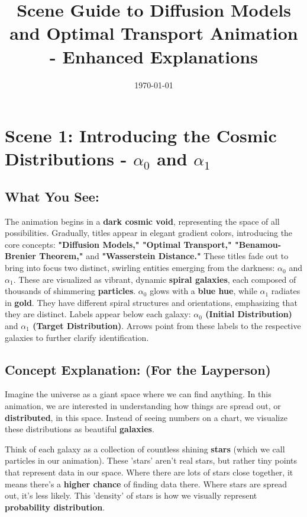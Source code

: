 \documentclass{article}
\title{Scene Guide to Diffusion Models and Optimal Transport Animation - Enhanced Explanations}
\date{\today}
\begin{document}
\maketitle

\section*{Scene 1: Introducing the Cosmic Distributions - \( \alpha_0 \) and \( \alpha_1 \)}

\subsection*{What You See:}

The animation begins in a \textbf{dark cosmic void}, representing the space of all possibilities. Gradually, titles appear in elegant gradient colors, introducing the core concepts: \textbf{"Diffusion Models," "Optimal Transport," "Benamou-Brenier Theorem,"} and \textbf{"Wasserstein Distance."} These titles fade out to bring into focus two distinct, swirling entities emerging from the darkness: \textbf{\( \alpha_0 \)} and \textbf{\( \alpha_1 \)}. These are visualized as vibrant, dynamic \textbf{spiral galaxies}, each composed of thousands of shimmering \textbf{particles}. \( \alpha_0 \) glows with a \textbf{blue hue}, while \( \alpha_1 \) radiates in \textbf{gold}. They have different spiral structures and orientations, emphasizing that they are distinct.  Labels appear below each galaxy: \textbf{\( \alpha_0 \) (Initial Distribution)} and \textbf{\( \alpha_1 \) (Target Distribution)}. Arrows point from these labels to the respective galaxies to further clarify identification.

\subsection*{Concept Explanation: (For the Layperson)}

Imagine the universe as a giant space where we can find anything. In this animation, we are interested in understanding how things are spread out, or \textbf{distributed}, in this space.  Instead of seeing numbers on a chart, we visualize these distributions as beautiful \textbf{galaxies}.

Think of each galaxy as a collection of countless shining \textbf{stars} (which we call particles in our animation).  These 'stars' aren't real stars, but rather tiny points that represent data in our space. Where there are lots of stars close together, it means there's a \textbf{higher chance} of finding data there. Where stars are spread out, it's less likely.  This 'density' of stars is how we visually represent \textbf{probability distribution}.
\end{document}
